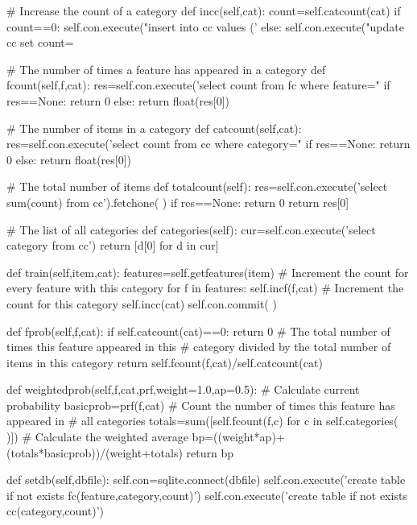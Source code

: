 \documentclass[12pt, letterpaper]{article}
\begin{document}
\begin{MyPython}[caption= Fisher Method, label=lst:fishermethod]
    # Increase the count of a category
    def incc(self,cat):
        count=self.catcount(cat)
        if count==0:
            self.con.execute("insert into cc values ('%
        else:
            self.con.execute("update cc set count=%

    # The number of times a feature has appeared in a category
    def fcount(self,f,cat):
        res=self.con.execute('select count from fc where feature="%
        if res==None:
            return 0
        else: return float(res[0])

    # The number of items in a category
    def catcount(self,cat):
        res=self.con.execute('select count from cc where category="%
        if res==None:
            return 0
        else:
            return float(res[0])

    # The total number of items
    def totalcount(self):
        res=self.con.execute('select sum(count) from cc').fetchone( )
        if res==None:
            return 0
        return res[0]

    # The list of all categories
    def categories(self):
        cur=self.con.execute('select category from cc')
        return [d[0] for d in cur]

    def train(self,item,cat):
        features=self.getfeatures(item)
        # Increment the count for every feature with this category
        for f in features:
            self.incf(f,cat)
        # Increment the count for this category
        self.incc(cat)
        self.con.commit( )

    def fprob(self,f,cat):
        if self.catcount(cat)==0:
            return 0
        # The total number of times this feature appeared in this
        # category divided by the total number of items in this category
        return self.fcount(f,cat)/self.catcount(cat)

    def weightedprob(self,f,cat,prf,weight=1.0,ap=0.5):
        # Calculate current probability
        basicprob=prf(f,cat)
        # Count the number of times this feature has appeared in
        # all categories
        totals=sum([self.fcount(f,c) for c in self.categories( )])
        # Calculate the weighted average
        bp=((weight*ap)+(totals*basicprob))/(weight+totals)
        return bp

    def setdb(self,dbfile):
        self.con=sqlite.connect(dbfile)
        self.con.execute('create table if not exists fc(feature,category,count)')
        self.con.execute('create table if not exists cc(category,count)')


\end{MyPython}
\end{document}
